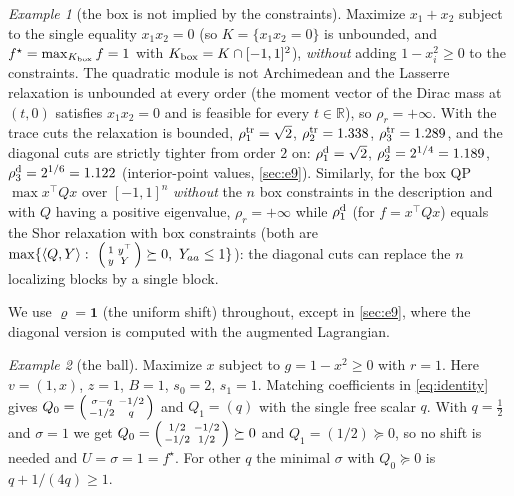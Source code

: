 \documentclass[a4paper,11pt]{article}
\theoremstyle{plain}
\theoremstyle{definition}
\theoremstyle{remark}
\newtheorem{example}{Example}
\newcommand{\R}{\mathbb{R}}
\begin{document}
\begin{example}[the box is not implied by the constraints]\label{ex:boxfree}
Maximize $x_1+x_2$ subject to the single equality $x_1x_2=0$ (so $K=\{x_1x_2=0\}$ is unbounded, and $f^\star=\max_{K_{\rm box}}f=1$ with $K_{\rm box}=K\cap[-1,1]^2$), \emph{without} adding $1-x_i^2\ge0$ to the constraints. The quadratic module is not Archimedean and the Lasserre relaxation is unbounded at every order (the moment vector of the Dirac mass at $(t,0)$ satisfies $x_1x_2=0$ and is feasible for every $t\in\R$), so $\rho_r=+\infty$. With the trace cuts the relaxation is bounded, $\rho_1^{\rm tr}=\sqrt2$, $\rho_2^{\rm tr}=1.338$, $\rho_3^{\rm tr}=1.289$, and the diagonal cuts are strictly tighter from order $2$ on: $\rho_1^{\rm d}=\sqrt2$, $\rho_2^{\rm d}=2^{1/4}=1.189$, $\rho_3^{\rm d}=2^{1/6}=1.122$ (interior-point values, \cref{sec:e9}). Similarly, for the box QP $\max x^\top Qx$ over $[-1,1]^n$ \emph{without} the $n$ box constraints in the description and with $Q$ having a positive eigenvalue, $\rho_r=+\infty$ while $\rho_1^{\rm d}$ (for $f=x^\top Qx$) equals the Shor relaxation with box constraints (both are $\max\{\langle Q,Y\rangle:\ \begin{psmallmatrix}1&y^\top\\y&Y\end{psmallmatrix}\succeq0,\ Y_{aa}\le1\}$): the diagonal cuts can replace the $n$ localizing blocks by a single block.
\end{example}
We use $\varrho=\mathbf1$ (the uniform shift) throughout, except in \cref{sec:e9}, where the diagonal version is computed with the augmented Lagrangian.

\begin{example}[the ball]\label{ex:ball}
Maximize $x$ subject to $g=1-x^2\ge0$ with $r=1$. Here $v=(1,x)$, $z=1$, $B=1$, $s_0=2$, $s_1=1$. Matching coefficients in \eqref{eq:identity} gives $Q_0=\begin{psmallmatrix}\sigma-q&-1/2\\-1/2&q\end{psmallmatrix}$ and $Q_1=(q)$ with the single free scalar $q$. With $q=\tfrac12$ and $\sigma=1$ we get $Q_0=\begin{psmallmatrix}1/2&-1/2\\-1/2&1/2\end{psmallmatrix}\succeq0$ and $Q_1=(1/2)\succeq0$, so no shift is needed and $U=\sigma=1=f^\star$. For other $q$ the minimal $\sigma$ with $Q_0\succeq 0$ is $q+1/(4q)\ge1$.
\end{example}
\end{document}
